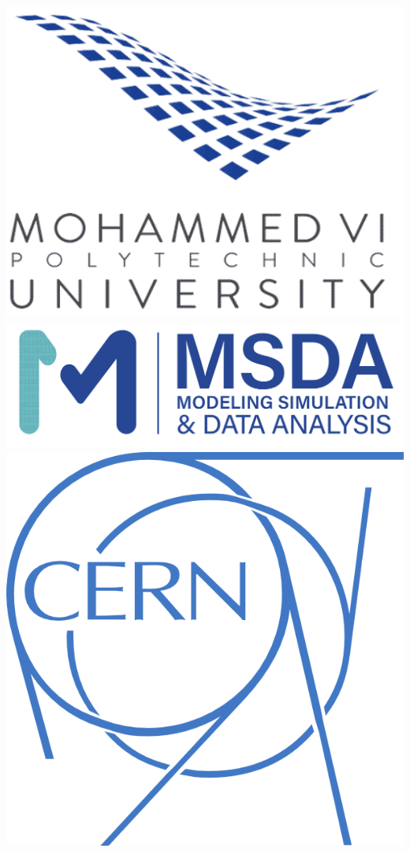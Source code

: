\documentclass[11pt,a4paper]{report}
\begin{document}
\begin{titlepage}
		\includegraphics[scale=0.25]{imgs/um6p_logo.png}
		\hfill
		\includegraphics[scale=0.4]{imgs/msda_logo.png}
		\vfill
		\includegraphics[scale=0.6]{imgs/CERN_logo_white.png}

\end{titlepage}
\end{document}
